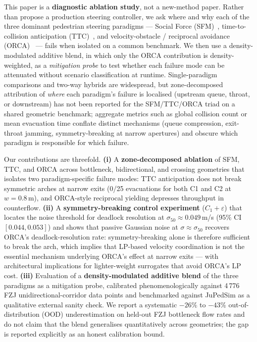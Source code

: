 \documentclass[a4paper,twoside]{article}
\begin{document}
This paper is a \textbf{diagnostic ablation study}, not a new-method paper. Rather than propose a production steering controller, we ask where and why each of the three dominant pedestrian steering paradigms --- Social Force (SFM)~\cite{Helbing95,Helbing00}, time-to-collision anticipation (TTC)~\cite{Karamouzas14}, and velocity-obstacle / reciprocal avoidance (ORCA)~\cite{Fiorini98,VandenBerg11} --- fails when isolated on a common benchmark. We then use a density-modulated additive blend, in which only the ORCA contribution is density-weighted, as a \emph{mitigation probe} to test whether each failure mode can be attenuated without scenario classification at runtime. Single-paradigm comparisons and two-way hybrids are widespread, but zone-decomposed attribution of \emph{where} each paradigm's failure is localised (upstream queue, throat, or downstream) has not been reported for the SFM/TTC/ORCA triad on a shared geometric benchmark; aggregate metrics such as global collision count or mean evacuation time conflate distinct mechanisms (queue compression, exit-throat jamming, symmetry-breaking at narrow apertures) and obscure which paradigm is responsible for which failure.

Our contributions are threefold. \textbf{(i)} A \textbf{zone-decomposed ablation} of SFM, TTC, and ORCA across bottleneck, bidirectional, and crossing geometries that isolates two paradigm-specific failure modes: TTC anticipation does not break symmetric arches at narrow exits (0/25 evacuations for both C1 and C2 at $w=0.8$\,m), and ORCA-style reciprocal yielding depresses throughput in counterflow. \textbf{(ii)} A \textbf{symmetry-breaking control experiment} ($C_1{+}\varepsilon$) that locates the noise threshold for deadlock resolution at $\sigma_{50}\!\approx\!0.049$\,m/s (95\% CI $[0.044, 0.053]$) and shows that passive Gaussian noise at $\sigma\!\approx\!\sigma_{50}$ recovers ORCA's deadlock-resolution rate: symmetry-breaking alone is therefore sufficient to break the arch, which implies that LP-based velocity coordination is not the essential mechanism underlying ORCA's effect at narrow exits --- with architectural implications for lighter-weight surrogates that avoid ORCA's LP cost. \textbf{(iii)} Evaluation of a \textbf{density-modulated additive blend} of the three paradigms as a mitigation probe, calibrated phenomenologically against 4\,776 FZJ unidirectional-corridor data points and benchmarked against JuPedSim as a qualitative external sanity check. We report a systematic $-26\%$ to $-43\%$ out-of-distribution (OOD) underestimation on held-out FZJ bottleneck flow rates and do not claim that the blend generalises quantitatively across geometries; the gap is reported explicitly as an honest calibration bound.
\end{document}

